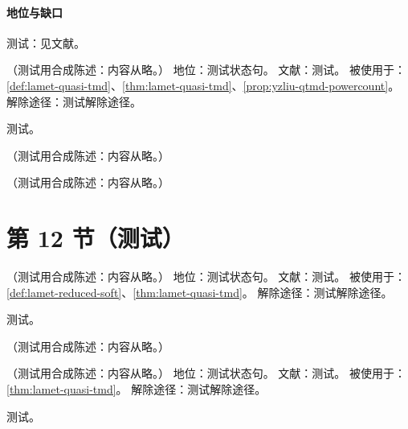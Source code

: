 \paragraph{地位与缺口}测试：见文献。

\begin{assumption}\label{asm:lamet-staple}
（测试用合成陈述：内容从略。）
地位：测试状态句。
文献：测试。
被使用于：\cref{def:lamet-quasi-tmd}、\cref{thm:lamet-quasi-tmd}、\cref{prop:yzliu-qtmd-powercount}。
解除途径：测试解除途径。
\end{assumption}
\begin{proofsketch}测试。\end{proofsketch}

\begin{definition}[准 TMD]\label{def:lamet-quasi-tmd}
（测试用合成陈述：内容从略。）
\end{definition}

\begin{definition}\label{def:lamet-soft-offlc}
（测试用合成陈述：内容从略。）
\end{definition}

\section{第 12 节（测试）}\label{sec:lamet-offforward}

\begin{assumption}\label{asm:lamet-soft-rapidity}
（测试用合成陈述：内容从略。）
地位：测试状态句。
文献：测试。
被使用于：\cref{def:lamet-reduced-soft}、\cref{thm:lamet-quasi-tmd}。
解除途径：测试解除途径。
\end{assumption}
\begin{proofsketch}测试。\end{proofsketch}

\begin{definition}[约化软函数 $S_r$]\label{def:lamet-reduced-soft}
（测试用合成陈述：内容从略。）
\end{definition}

\begin{assumption}\label{asm:lamet-order-limits}
（测试用合成陈述：内容从略。）
地位：测试状态句。
文献：测试。
被使用于：\cref{thm:lamet-quasi-tmd}。
解除途径：测试解除途径。
\end{assumption}
\begin{proofsketch}测试。\end{proofsketch}

